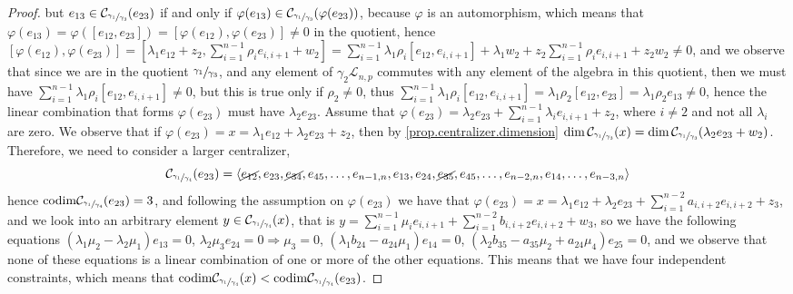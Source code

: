 \documentclass[12pt]{article}
\newcommand*\circled[1]{\tikz[baseline=(char.base)]{
            \small \node[shape=circle,draw,inner sep=1pt] (char) {#1};}}
\begin{document}
\begin{proof}
but $e_{13}\in\mathcal{C}_{\sfrac{\gamma_1}{\gamma_3}}(e_{23})$ if and only if $\varphi(e_{13})\in\mathcal{C}_{\sfrac{\gamma_1}{\gamma_3}}(\varphi(e_{23}))$, because $\varphi$ is an automorphism, which means that  $\varphi(e_{13})=\varphi([e_{12},e_{23}])=[\varphi(e_{12}),\varphi(e_{23})]\neq 0$ in the quotient, hence $[\varphi(e_{12}),\varphi(e_{23})]=[\lambda_1 e_{12}+z_2,\sum_{i=1}^{n-1}\rho_i e_{i,i+1}+w_2]=\sum_{i=1}^{n-1}\lambda_1\rho_i [e_{12},e_{i,i+1}]+\lambda_1 w_2+z_2\sum_{i=1}^{n-1}\rho_i e_{i,i+1}+z_2 w_2\neq 0$, and we observe that since we are in the quotient $\sfrac{\gamma_1}{\gamma_3}$, and any element of $\gamma_2\mathcal{L}_{n,p}$ commutes with any element of the algebra in this quotient, then we must have $\sum_{i=1}^{n-1}\lambda_1\rho_i [e_{12},e_{i,i+1}]\neq 0$, but this is true only if $\rho_2\neq 0$, thus $\sum_{i=1}^{n-1}\lambda_1\rho_i [e_{12},e_{i,i+1}]=\lambda_1\rho_2[e_{12},e_{23}]=\lambda_1\rho_2 e_{13}\neq 0$, hence the linear combination that forms $\varphi(e_{23})$ must have $\lambda_2 e_{23}$. Assume that $\varphi(e_{23})=\lambda_2 e_{23}+\sum_{i=1}^{n-1}\lambda_i e_{i,i+1}+z_2$, where $i\neq 2$ and not all $\lambda_i$ are zero. We observe that if $\varphi(e_{23})=x=\lambda_1 e_{12}+\lambda_2 e_{23}+z_2$, then by \ref{prop.centralizer.dimension} $\dim\mathcal{C}_{\sfrac{\gamma_1}{\gamma_3}}(x)=\dim\mathcal{C}_{\sfrac{\gamma_1}{\gamma_3}}(\lambda_2 e_{23}+w_2)$. Therefore, we need to consider a larger centralizer, \[\mathcal{C}_{\sfrac{\gamma_1}{\gamma_4}}(e_{23})=\langle \cancel{e_{12}},e_{23},\cancel{e_{34}},e_{45},\dots,e_{n-1,n},e_{13},e_{24},\cancel{e_{35}},e_{45},\dots,e_{n-2,n},e_{14},\dots,e_{n-3,n}\rangle\] hence $\mathrm{codim}\mathcal{C}_{\sfrac{\gamma_1}{\gamma_4}}(e_{23})=3$, and following the assumption on $\varphi(e_{23})$ we have that $\varphi(e_{23})=x=\lambda_1 e_{12}+\lambda_2 e_{23}+\sum_{i=1}^{n-2}a_{i,i+2}e_{i,i+2}+z_3$, and we look into an arbitrary element $y\in\mathcal{C}_{\sfrac{\gamma_1}{\gamma_4}}(x)$, that is $y=\sum_{i=1}^{n-1}\mu_i e_{i,i+1}+\sum_{i=1}^{n-2}b_{i,i+2}e_{i,i+2}+w_3$, so we have the following equations 
\circled{1} $(\lambda_1\mu_2-\lambda_2\mu_1)e_{13}=0$, \circled{2}
$\lambda_2\mu_3 e_{24}=0\Rightarrow\mu_3=0$, \circled{3}
$(\lambda_1 b_{24}-a_{24}\mu_1)e_{14}=0$, \circled{4}
$(\lambda_2 b_{35}-a_{35}\mu_2+a_{24}\mu_4)e_{25}=0$, and we observe that none of these equations is a linear combination of one or more of the other equations. This means that we have four independent constraints, which means that $\mathrm{codim}\mathcal{C}_{\sfrac{\gamma_1}{\gamma_4}}(x)<\mathrm{codim}\mathcal{C}_{\sfrac{\gamma_1}{\gamma_4}}(e_{23})$.

\end{proof}
\end{document}
